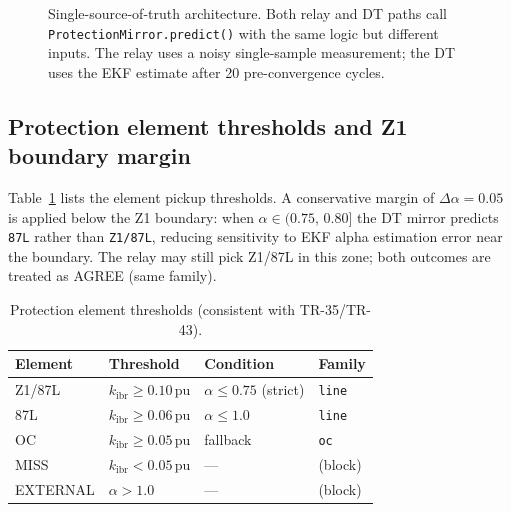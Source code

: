 \documentclass[11pt,a4paper]{article}
\newcommand{\kibr}{k_\mathrm{ibr}}
\begin{document}
\begin{figure}[htbp]
  \caption{Single-source-of-truth architecture.  Both relay and DT paths call
    \texttt{ProtectionMirror.predict()} with the same logic but different
    inputs.  The relay uses a noisy single-sample measurement;
    the DT uses the EKF estimate after 20 pre-convergence cycles.}
  \label{fig:arch}
\end{figure}

\subsection{Protection element thresholds and Z1 boundary margin}
\label{sec:thresholds}

Table~\ref{tab:thresholds} lists the element pickup thresholds.  A conservative
margin of $\Delta\alpha=0.05$ is applied below the Z1 boundary: when
$\alpha\in(0.75,\,0.80]$ the DT mirror predicts \texttt{87L} rather than
\texttt{Z1/87L}, reducing sensitivity to EKF alpha estimation error near the
boundary.  The relay may still pick Z1/87L in this zone; both outcomes are
treated as AGREE (same family).

\begin{table}[htbp]
  \centering
  \caption{Protection element thresholds (consistent with TR-35/TR-43).}
  \label{tab:thresholds}
  \begin{tabular}{@{}llll@{}}
    \toprule
    Element & Threshold & Condition & Family \\
    \midrule
    Z1/87L  & $\kibr \geq 0.10$\,pu & $\alpha \leq 0.75$ (strict) & \texttt{line} \\
    87L     & $\kibr \geq 0.06$\,pu & $\alpha \leq 1.0$             & \texttt{line} \\
    OC      & $\kibr \geq 0.05$\,pu & fallback                       & \texttt{oc}   \\
    MISS    & $\kibr < 0.05$\,pu    & —                              & (block)       \\
    EXTERNAL & $\alpha > 1.0$       & —                              & (block)       \\
    \bottomrule
  \end{tabular}
\end{table}
\end{document}
